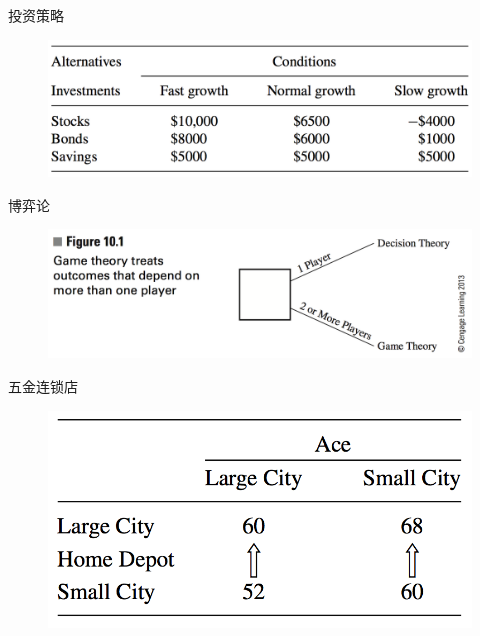 \documentclass[UTF8]{ctexbeamer}
\begin{document}
\begin{frame}{投资策略}
  
  \begin{figure}
    \includegraphics[width=0.8\textwidth{}]{invest.png}
  \end{figure}
  
\end{frame}

\begin{frame}{博弈论}
  
  \begin{figure}
    \includegraphics[width=0.8\textwidth{}]{10_1.png}
  \end{figure}

\end{frame}

\begin{frame}{五金连锁店}
  
  \begin{figure}
    \includegraphics[width=0.8\textwidth{}]{homedepot.png}
  \end{figure}

\end{frame}
\end{document}
